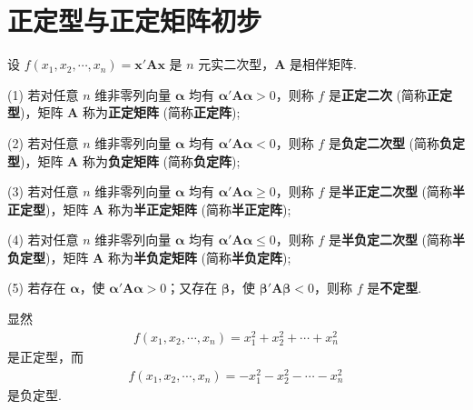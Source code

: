 \documentclass[../../main.tex]{subfiles}
\begin{document}
\section{正定型与正定矩阵初步}

\begin{definition}
设 $f(x_1,x_2,\cdots,x_n)=\boldsymbol{x}'\boldsymbol{A}\boldsymbol{x}$ 是 $n$ 元实二次型，$\boldsymbol{A}$ 是相伴矩阵.

(1) 若对任意 $n$ 维非零列向量 $\boldsymbol{\alpha}$ 均有 $\boldsymbol{\alpha}'\boldsymbol{A}\boldsymbol{\alpha}>0$，则称 $f$ 是\textbf{正定二次} (简称\textbf{正定型})，矩阵 $\boldsymbol{A}$ 称为\textbf{正定矩阵} (简称\textbf{正定阵});

(2) 若对任意 $n$ 维非零列向量 $\boldsymbol{\alpha}$ 均有 $\boldsymbol{\alpha}'\boldsymbol{A}\boldsymbol{\alpha}<0$，则称 $f$ 是\textbf{负定二次型} (简称\textbf{负定型})，矩阵 $\boldsymbol{A}$ 称为\textbf{负定矩阵} (简称\textbf{负定阵});

(3) 若对任意 $n$ 维非零列向量 $\boldsymbol{\alpha}$ 均有 $\boldsymbol{\alpha}'\boldsymbol{A}\boldsymbol{\alpha}\geq0$，则称 $f$ 是\textbf{半正定二次型} (简称\textbf{半正定型})，矩阵 $\boldsymbol{A}$ 称为\textbf{半正定矩阵} (简称\textbf{半正定阵});

(4) 若对任意 $n$ 维非零列向量 $\boldsymbol{\alpha}$ 均有 $\boldsymbol{\alpha}'\boldsymbol{A}\boldsymbol{\alpha}\leq0$，则称 $f$ 是\textbf{半负定二次型} (简称\textbf{半负定型})，矩阵 $\boldsymbol{A}$ 称为\textbf{半负定矩阵} (简称\textbf{半负定阵});

(5) 若存在 $\boldsymbol{\alpha}$，使 $\boldsymbol{\alpha}'\boldsymbol{A}\boldsymbol{\alpha}>0$；又存在 $\boldsymbol{\beta}$，使 $\boldsymbol{\beta}'\boldsymbol{A}\boldsymbol{\beta}<0$，则称 $f$ 是\textbf{不定型}.
\end{definition}
\begin{remark}
显然
\begin{align*}
f(x_1,x_2,\cdots,x_n)=x_1^2 + x_2^2 + \cdots + x_n^2
\end{align*}
是正定型，而
\begin{align*}
f(x_1,x_2,\cdots,x_n)=-x_1^2 - x_2^2 - \cdots - x_n^2
\end{align*}
是负定型. 
\end{remark}
\end{document}
